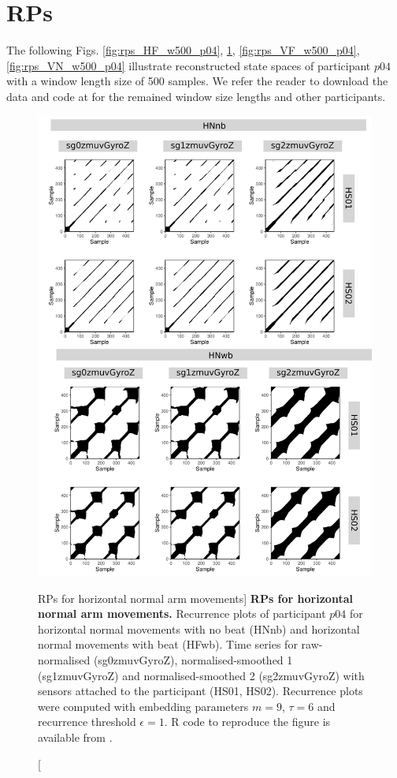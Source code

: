\newpage
\section{RPs} \label{appendix:d:rps}


The following Figs.  
\ref{fig:rps_HF_w500_p04},
\ref{fig:rps_HN_w500_p04},
\ref{fig:rps_VF_w500_p04},
\ref{fig:rps_VN_w500_p04}
illustrate reconstructed state spaces 
of participant $p04$ with a window length size of 500 samples.
We refer the reader to download the data and code at \cite{hwum2018}
for the remained window size lengths and other participants.






\begin{figure}
\centering
\includegraphics[height=0.8\textheight]{rps_HN_w500_p04}
\caption
	[RPs for horizontal normal arm movements]{
	{\bf RPs for horizontal normal arm movements.}	
	Recurrence plots of participant $p04$ for 
	horizontal normal movements with no beat (HNnb) and
	horizontal normal movements with beat (HFwb).
	Time series for raw-normalised (sg0zmuvGyroZ), 
	normalised-smoothed 1 (sg1zmuvGyroZ) and 
	normalised-smoothed 2 (sg2zmuvGyroZ) with
	sensors attached to the participant (HS01, HS02).
	Recurrence plots were computed with 
	embedding parameters $m=9$, $\tau=6$ and 
	recurrence threshold $\epsilon=1$.
	R code to reproduce the figure is available from \cite{hwum2018}.
        }
    \label{fig:rps_HN_w500_p04}
\end{figure}
